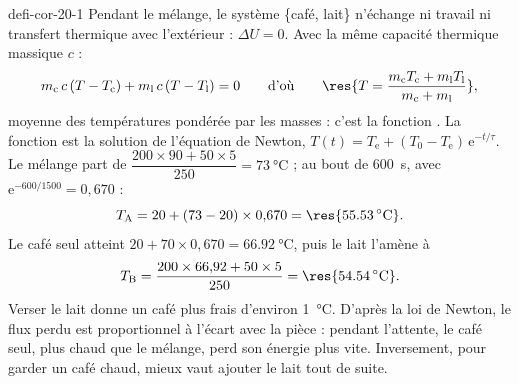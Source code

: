 \begin{blocEdition}{defi-cor-20-1}
Pendant le mélange, le système \{café, lait\} n'échange ni travail ni transfert thermique avec l'extérieur :
$\Delta U=0$. Avec la même capacité thermique massique $c$ :
\[m_\mathrm{c}\,c\,(T-T_\mathrm{c})+m_\mathrm{l}\,c\,(T-T_\mathrm{l})=0\qquad\text{d'où}\qquad \res{T=\frac{m_\mathrm{c}T_\mathrm{c}+m_\mathrm{l}T_\mathrm{l}}{m_\mathrm{c}+m_\mathrm{l}}},\]
moyenne des températures pondérée par les masses : c'est la fonction .
La fonction  est la solution de l'équation de Newton, $T(t)=T_\mathrm{e}+(T_0-T_\mathrm{e})\,\mathrm{e}^{-t/\tau}$. Le
mélange part de $\dfrac{200\times90+50\times5}{250}=\qty{73}{\degreeCelsius}$ ; au bout de \qty{600}{s}, avec
$\mathrm{e}^{-600/1500}=0{,}670$ :
\[T_\mathrm{A}=20+(73-20)\times0{,}670=\res{\qty{55,53}{\degreeCelsius}}.\]
Le café seul atteint $20+70\times0{,}670=\qty{66,92}{\degreeCelsius}$, puis le lait l'amène à
\[T_\mathrm{B}=\frac{200\times66{,}92+50\times5}{250}=\res{\qty{54,54}{\degreeCelsius}}.\]
Verser le lait  donne un café plus frais d'environ \qty{1}{\degreeCelsius}. D'après la loi de Newton, le flux
perdu est proportionnel à l'écart avec la pièce : pendant l'attente, le café seul, plus chaud que le mélange, perd son
énergie plus vite. Inversement, pour garder un café chaud, mieux vaut ajouter le lait tout de suite.
\end{blocEdition}

